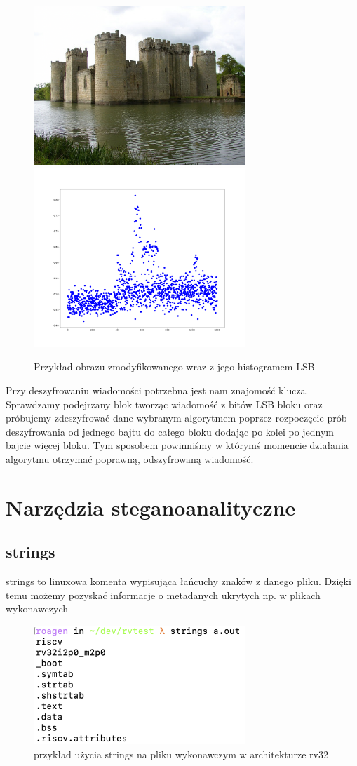 \documentclass{article}
\begin{document}
\begin{figure}[H]
	\centering
	\includegraphics[width=8cm]{modified_castle.png}
	\includegraphics[width=8cm]{mod_hist.png}
	\caption{Przykład obrazu zmodyfikowanego wraz z jego histogramem LSB}
\end{figure}
Przy deszyfrowaniu wiadomości potrzebna jest nam znajomość klucza. Sprawdzamy podejrzany blok tworząc wiadomość z bitów LSB bloku oraz próbujemy zdeszyfrować dane wybranym algorytmem poprzez rozpoczęcie prób deszyfrowania od jednego bajtu do całego bloku dodając po kolei po jednym bajcie więcej bloku. Tym sposobem powinniśmy w którymś momencie działania algorytmu otrzymać poprawną, odszyfrowaną wiadomość.
\section{Narzędzia steganoanalityczne}
\subsection{strings}
strings to linuxowa komenta wypisująca łańcuchy znaków z danego pliku. Dzięki temu możemy pozyskać informacje 
o metadanych ukrytych np. w plikach wykonawczych
\begin{figure}[H]
	\centering
	\includegraphics[width=8cm]{strings_example}
	\caption{przykład użycia strings na pliku wykonawczym w architekturze rv32}
\end{figure}
\end{document}
